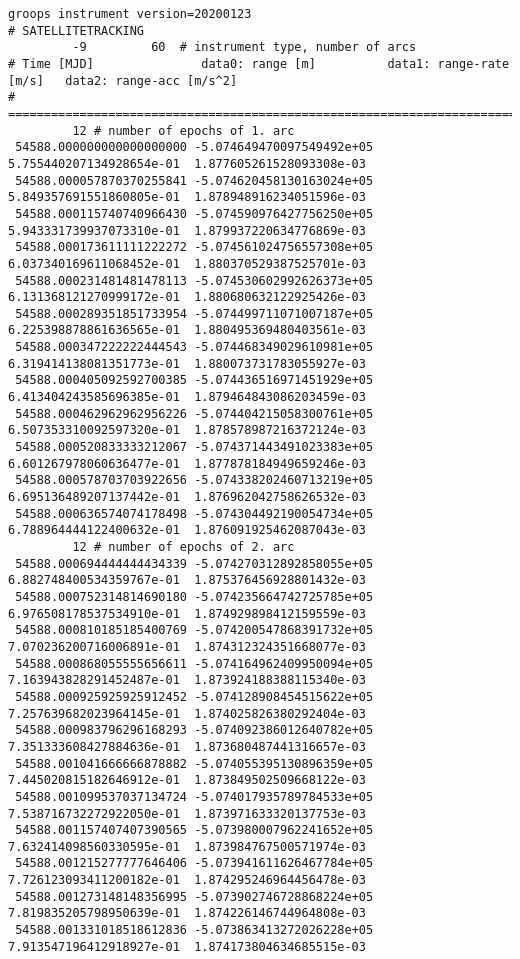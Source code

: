 \begin{verbatim}
groops instrument version=20200123
# SATELLITETRACKING
         -9         60  # instrument type, number of arcs
# Time [MJD]               data0: range [m]          data1: range-rate [m/s]   data2: range-acc [m/s^2]
# =====================================================================================================
         12 # number of epochs of 1. arc
 54588.000000000000000000 -5.074649470097549492e+05  5.755440207134928654e-01  1.877605261528093308e-03
 54588.000057870370255841 -5.074620458130163024e+05  5.849357691551860805e-01  1.878948916234051596e-03
 54588.000115740740966430 -5.074590976427756250e+05  5.943331739937073310e-01  1.879937220634776869e-03
 54588.000173611111222272 -5.074561024756557308e+05  6.037340169611068452e-01  1.880370529387525701e-03
 54588.000231481481478113 -5.074530602992626373e+05  6.131368121270999172e-01  1.880680632122925426e-03
 54588.000289351851733954 -5.074499711071007187e+05  6.225398878861636565e-01  1.880495369480403561e-03
 54588.000347222222444543 -5.074468349029610981e+05  6.319414138081351773e-01  1.880073731783055927e-03
 54588.000405092592700385 -5.074436516971451929e+05  6.413404243585696385e-01  1.879464843086203459e-03
 54588.000462962962956226 -5.074404215058300761e+05  6.507353310092597320e-01  1.878578987216372124e-03
 54588.000520833333212067 -5.074371443491023383e+05  6.601267978060636477e-01  1.877878184949659246e-03
 54588.000578703703922656 -5.074338202460713219e+05  6.695136489207137442e-01  1.876962042758626532e-03
 54588.000636574074178498 -5.074304492190054734e+05  6.788964444122400632e-01  1.876091925462087043e-03
         12 # number of epochs of 2. arc
 54588.000694444444434339 -5.074270312892858055e+05  6.882748400534359767e-01  1.875376456928801432e-03
 54588.000752314814690180 -5.074235664742725785e+05  6.976508178537534910e-01  1.874929898412159559e-03
 54588.000810185185400769 -5.074200547868391732e+05  7.070236200716006891e-01  1.874312324351668077e-03
 54588.000868055555656611 -5.074164962409950094e+05  7.163943828291452487e-01  1.873924188388115340e-03
 54588.000925925925912452 -5.074128908454515622e+05  7.257639682023964145e-01  1.874025826380292404e-03
 54588.000983796296168293 -5.074092386012640782e+05  7.351333608427884636e-01  1.873680487441316657e-03
 54588.001041666666878882 -5.074055395130896359e+05  7.445020815182646912e-01  1.873849502509668122e-03
 54588.001099537037134724 -5.074017935789784533e+05  7.538716732272922050e-01  1.873971633320137753e-03
 54588.001157407407390565 -5.073980007962241652e+05  7.632414098560330595e-01  1.873984767500571974e-03
 54588.001215277777646406 -5.073941611626467784e+05  7.726123093411200182e-01  1.874295246964456478e-03
 54588.001273148148356995 -5.073902746728868224e+05  7.819835205798950639e-01  1.874226146744964808e-03
 54588.001331018518612836 -5.073863413272026228e+05  7.913547196412918927e-01  1.874173804634685515e-03
\end{verbatim}


